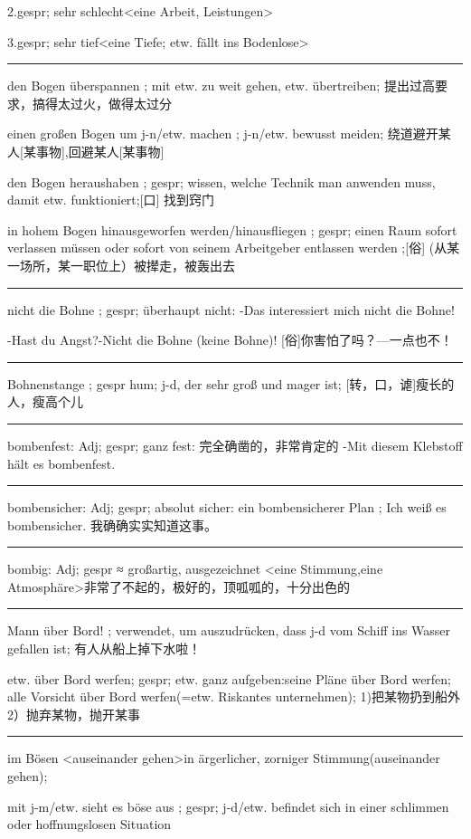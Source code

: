 2.gespr; sehr schlecht\textless eine Arbeit, Leistungen\textgreater 

3.gespr; sehr tief\textless eine Tiefe; etw. fällt ins Bodenlose\textgreater  

\noindent\rule{\textwidth}{1pt} 
den Bogen überspannen ; mit etw. zu weit gehen, etw. übertreiben; 提出过高要求，搞得太过火，做得太过分

einen großen Bogen um j-n/etw. machen ; j-n/etw. bewusst meiden; 绕道避开某人[某事物],回避某人[某事物]

den Bogen heraushaben ; gespr; wissen, welche Technik man anwenden muss, damit etw. funktioniert;[口] 找到窍门

in hohem Bogen hinausgeworfen werden/hinausfliegen ; gespr; einen Raum sofort verlassen müssen oder sofort von seinem Arbeitgeber entlassen werden ;[俗] (从某一场所，某一职位上）被撵走，被轰出去

\noindent\rule{\textwidth}{1pt} 
nicht die Bohne ; gespr; überhaupt nicht: -Das interessiert mich nicht die Bohne!

-Hast du Angst?-Nicht die Bohne (keine Bohne)! [俗]你害怕了吗？---一点也不！

\noindent\rule{\textwidth}{1pt} 
Bohnenstange ; gespr hum; j-d, der sehr groß und mager ist; [转，口，谑]瘦长的人，瘦高个儿

\noindent\rule{\textwidth}{1pt} 
bombenfest: Adj; gespr; ganz fest: 完全确凿的，非常肯定的
-Mit diesem Klebstoff hält es bombenfest.

\noindent\rule{\textwidth}{1pt} 
bombensicher: Adj; gespr; absolut sicher: ein bombensicherer Plan ;
Ich weiß es bombensicher. 我确确实实知道这事。

\noindent\rule{\textwidth}{1pt} 
bombig: Adj; gespr ≈ großartig, ausgezeichnet \textless eine Stimmung,eine Atmosphäre\textgreater  非常了不起的，极好的，顶呱呱的，十分出色的

\noindent\rule{\textwidth}{1pt} 
Mann über Bord! ; verwendet, um auszudrücken, dass j-d vom Schiff ins Wasser gefallen ist; 有人从船上掉下水啦！

etw. über Bord werfen; gespr; etw. ganz aufgeben:seine Pläne über Bord werfen; alle Vorsicht über Bord werfen(=etw. Riskantes unternehmen); 1)把某物扔到船外2）抛弃某物，抛开某事

\noindent\rule{\textwidth}{1pt} 
im Bösen \textless auseinander gehen\textgreater  in ärgerlicher, zorniger Stimmung(auseinander gehen);

mit j-m/etw. sieht es böse aus ; gespr; j-d/etw. befindet sich in einer schlimmen oder hoffnungslosen Situation

